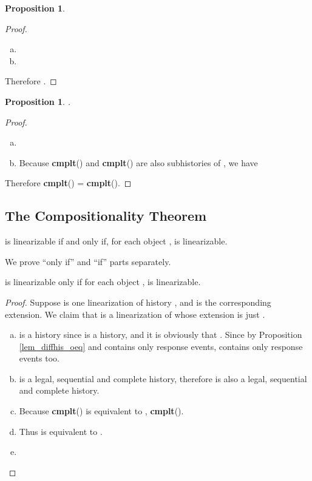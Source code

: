 \documentclass[a4paper,USenglish]{lipics-v2016}
\newtheorem{prop}[theorem]{Proposition}
\newcommand{\linb}{linearizable}
\newcommand{\linz}{linearization}
\newcommand{\cmplt}{\textbf{cmplt}}
\newcommand{\his}{\text{H}}
\newcommand{\shis}{\text{S}}
\begin{document}
\begin{prop}\label{lem_subhis_op}
	
\end{prop}
\begin{proof}
	\begin{enumerate}[(a)]
		\item
		
		\item
		
	\end{enumerate}
	Therefore .
\end{proof}

\begin{prop}\label{lem_subhis_complo}
	.
\end{prop}
\begin{proof}
	\begin{enumerate}[(a)]
		\item
		
		
		\item
		Because \cmplt({\his}) and \cmplt() are also subhistories of {\his}, we have
		
	\end{enumerate}
	Therefore \cmplt() = \cmplt({\his}).
\end{proof}

\subsection{The Compositionality Theorem}\label{comp_thm}

\begin{theorem}\label{thm_lin}
	{\his} is {\linb} if and only if, for each object ,  is {\linb}.
\end{theorem}

We prove ``only if'' and ``if'' parts separately.

\begin{lemma}\label{lemma_lin_onlyif}
	{\his} is {\linb} only if for each object ,  is {\linb}.
\end{lemma}
\begin{proof}
	Suppose {\shis} is one {\linz} of history {\his}, and  is the corresponding extension.
	We claim that  is a {\linz} of  whose extension is just .
	\begin{enumerate}[(a)]
		\item
		 is a history since  is a history, and it is obviously that .
		Since  by Proposition \ref{lem_diffhis_oeq} and  contains only response events,  contains only response events too.
		\item
		{\shis} is a legal, sequential and complete history, therefore  is also a legal, sequential and complete history.
		\item
		Because \cmplt() is equivalent to {\shis},
		\cmplt().
		\item
		
		Thus  is equivalent to .
		\item
		
	\end{enumerate}
\end{proof}
\end{document}
